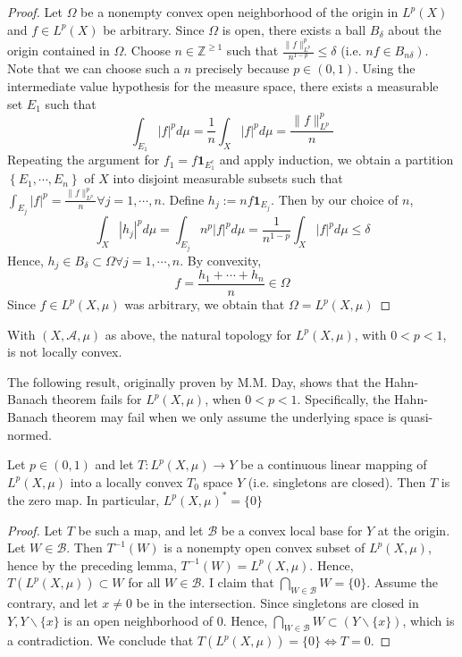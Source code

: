\begin{proof}
    Let $\Omega$ be a nonempty convex open neighborhood of the origin in $L^{p}(X)$ and $f \in L^{p}(X)$ be arbitrary. Since $\Omega$ is open, there exists a ball $B_{\delta}$ about the origin contained in $\Omega .$ Choose $n \in \mathbb{Z}^{\geq 1}$ such that $\frac{\|f\|_{L^{p}}^{p}}{n^{1-p}} \leq \delta$ (i.e. $\left.n f \in B_{n \delta}\right)$. Note that we can choose such a $n$ precisely because $p \in(0,1)$. Using the intermediate value hypothesis for the measure space, there exists a measurable set $E_{1}$ such that
    \[
        \int_{E_{1}}|f|^{p} d \mu=\frac{1}{n} \int_{X}|f|^{p} d \mu=\frac{\|f\|_{L^{p}}^{p}}{n}
    \]
    Repeating the argument for $f_{1}=f \mathbf{1}_{E_{1}^{c}}$ and apply induction, we obtain a partition $\left\{E_{1}, \cdots, E_{n}\right\}$ of $X$ into disjoint measurable subsets such that $\int_{E_{j}}|f|^{p}=\frac{\|f\|_{L^{p}}^{p}}{n} \forall j=1, \cdots, n .$ Define $h_{j}:=n f \mathbf{1}_{E_{j}} .$ Then by our choice of $n$,
    \[
        \int_{X}\left|h_{j}\right|^{p} d \mu=\int_{E_{j}} n^{p}|f|^{p} d \mu=\frac{1}{n^{1-p}} \int_{X}|f|^{p} d \mu \leq \delta
    \]
    Hence, $h_{j} \in B_{\delta} \subset \Omega \forall j=1, \cdots, n$. By convexity,
    \[
        f=\frac{h_{1}+\cdots+h_{n}}{n} \in \Omega
    \]
    Since $f \in L^{p}(X, \mu)$ was arbitrary, we obtain that $\Omega=L^{p}(X, \mu)$
\end{proof}
\begin{corollary}
    With $(X, \mathcal{A}, \mu)$ as above, the natural topology for $L^{p}(X, \mu)$, with $0<p<1$, is not locally convex.
\end{corollary}

The following result, originally proven by M.M. Day, shows that the Hahn-Banach theorem fails for $L^{p}(X, \mu)$, when $0<p<1$. Specifically, the Hahn-Banach theorem may fail when we only assume the underlying space is quasi-normed.

\begin{theorem}[M.M. Day]
    Let $p \in(0,1)$ and let $T: L^{p}(X, \mu) \rightarrow Y$ be a continuous linear mapping of $L^{p}(X, \mu)$ into a locally convex $T_{0}$ space $Y$ (i.e. singletons are closed). Then $T$ is the zero map. In particular, $L^{p}(X, \mu)^{*}=\{0\}$
\end{theorem}

\begin{proof}
    Let $T$ be such a map, and let $\mathcal{B}$ be a convex local base for $Y$ at the origin. Let $W \in \mathcal{B}$. Then $T^{-1}(W)$ is a nonempty open convex subset of $L^{p}(X, \mu)$, hence by the preceding lemma, $T^{-1}(W)=L^{p}(X, \mu)$. Hence, $T\left(L^{p}(X, \mu)\right) \subset W$ for all $W \in \mathcal{B} .$ I claim that $\bigcap_{W \in \mathcal{B}} W=\{0\} .$ Assume the contrary, and let $x \neq 0$ be in the intersection. Since singletons are closed in $Y, Y \backslash\{x\}$ is an open neighborhood of $0 .$ Hence, $\bigcap_{W \in \mathcal{B}} W \subset(Y \backslash\{x\})$, which is a contradiction. We conclude that $T\left(L^{p}(X, \mu)\right)=\{0\} \Longleftrightarrow T=0$.
\end{proof}
